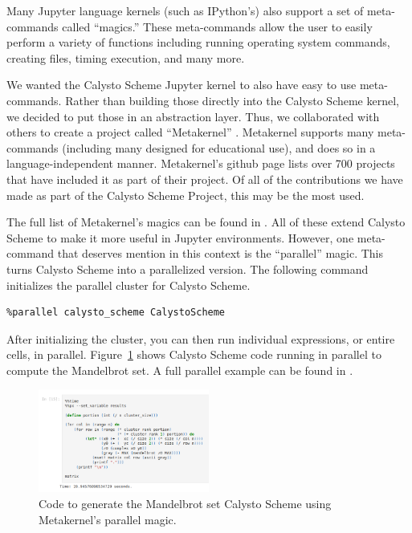\documentclass[acmsmall,screen,authorversion]{acmart}
\begin{document}
Many Jupyter language kernels (such as IPython's) also support a set
of meta-commands called ``magics.'' These meta-commands allow the user
to easily perform a variety of functions including running operating
system commands, creating files, timing execution, and many more.

We wanted the Calysto Scheme Jupyter kernel to also have easy to use
meta-commands. Rather than building those directly into the Calysto
Scheme kernel, we decided to put those in an abstraction layer. Thus,
we collaborated with others to create a project called ``Metakernel''
\cite{Metakernel}. Metakernel supports many meta-commands (including
many designed for educational use), and does so in a
language-independent manner. Metakernel's github page lists over 700
projects that have included it as part of their project. Of all of the
contributions we have made as part of the Calysto Scheme Project, this
may be the most used.

The full list of Metakernel's magics can be found in
\cite{MetakernelMagics}. All of these extend Calysto Scheme to make it
more useful in Jupyter environments. However, one meta-command that
deserves mention in this context is the ``parallel'' magic. This turns
Calysto Scheme into a parallelized version. The following command
initializes the parallel cluster for Calysto Scheme.

{\small
\begin{verbatim}
%parallel calysto_scheme CalystoScheme
\end{verbatim}
}

After initializing the cluster, you can then run individual
expressions, or entire cells, in
parallel. Figure~\ref{fig:parallelized-scheme} shows Calysto Scheme
code running in parallel to compute the Mandelbrot set. A full
parallel example can be found in
\cite{ParallelProcessingWithMetakernel}.

\begin{figure}[h]
  \centering
  \includegraphics[width=0.5\textwidth]{parallel-scheme.png}
  \caption{Code to generate the Mandelbrot set Calysto Scheme using Metakernel's parallel magic.}
  \label{fig:parallelized-scheme}
\end{figure}
\end{document}
